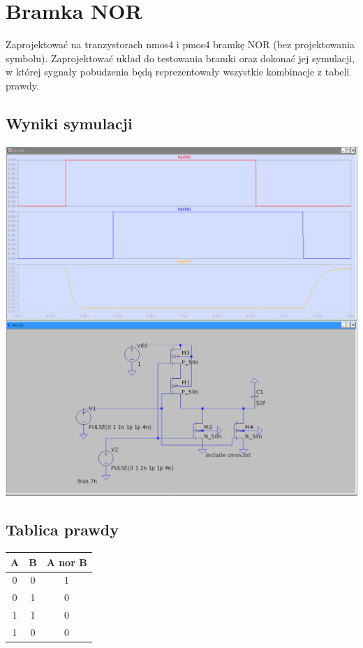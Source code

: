 \documentclass[a4paper, 11pt]{article}
\begin{document}
\pagebreak
\section{Bramka NOR}\label{sec:bramka_nor} %
Zaprojektować na tranzystorach nmos4 i pmos4 bramkę NOR (bez projektowania symbolu). Zaprojektować
układ do testowania bramki oraz dokonać jej symulacji, w której sygnały pobudzenia będą reprezentowały
wszystkie kombinacje z tabeli prawdy.
\subsection{Wyniki symulacji}\label{sub:wyniki_symulacji} %
\begin{center}
	\includegraphics[scale=0.35]{images/nor.png}
\end{center}
\subsection{Tablica prawdy}\label{sub:tablica_prawdy} %
\begin{center}
	\begin{tabular}{c|c|c}
		A & B & A nor B \\
		\hline
		0 & 0 & 1       \\
		0 & 1 & 0       \\
		1 & 1 & 0       \\
		1 & 0 & 0       \\
	\end{tabular}
\end{center}
\end{document}
